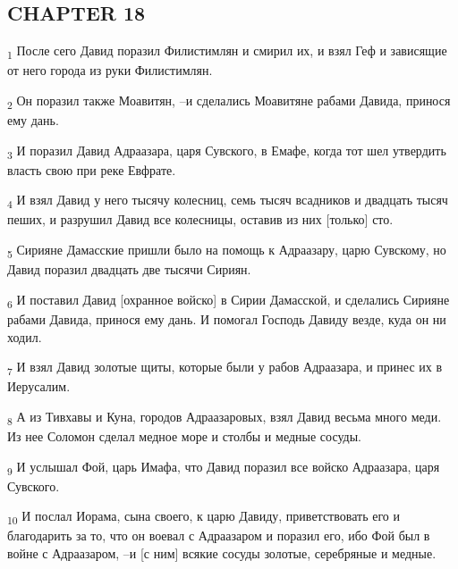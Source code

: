 \subsection{CHAPTER 18}
\begin{tcolorbox}
\textsubscript{1} После сего Давид поразил Филистимлян и смирил их, и взял Геф и зависящие от него города из руки Филистимлян.
\end{tcolorbox}
\begin{tcolorbox}
\textsubscript{2} Он поразил также Моавитян, --и сделались Моавитяне рабами Давида, принося ему дань.
\end{tcolorbox}
\begin{tcolorbox}
\textsubscript{3} И поразил Давид Адраазара, царя Сувского, в Емафе, когда тот шел утвердить власть свою при реке Евфрате.
\end{tcolorbox}
\begin{tcolorbox}
\textsubscript{4} И взял Давид у него тысячу колесниц, семь тысяч всадников и двадцать тысяч пеших, и разрушил Давид все колесницы, оставив из них [только] сто.
\end{tcolorbox}
\begin{tcolorbox}
\textsubscript{5} Сирияне Дамасские пришли было на помощь к Адраазару, царю Сувскому, но Давид поразил двадцать две тысячи Сириян.
\end{tcolorbox}
\begin{tcolorbox}
\textsubscript{6} И поставил Давид [охранное войско] в Сирии Дамасской, и сделались Сирияне рабами Давида, принося ему дань. И помогал Господь Давиду везде, куда он ни ходил.
\end{tcolorbox}
\begin{tcolorbox}
\textsubscript{7} И взял Давид золотые щиты, которые были у рабов Адраазара, и принес их в Иерусалим.
\end{tcolorbox}
\begin{tcolorbox}
\textsubscript{8} А из Тивхавы и Куна, городов Адраазаровых, взял Давид весьма много меди. Из нее Соломон сделал медное море и столбы и медные сосуды.
\end{tcolorbox}
\begin{tcolorbox}
\textsubscript{9} И услышал Фой, царь Имафа, что Давид поразил все войско Адраазара, царя Сувского.
\end{tcolorbox}
\begin{tcolorbox}
\textsubscript{10} И послал Иорама, сына своего, к царю Давиду, приветствовать его и благодарить за то, что он воевал с Адраазаром и поразил его, ибо Фой был в войне с Адраазаром, --и [с ним] всякие сосуды золотые, серебряные и медные.
\end{tcolorbox}

